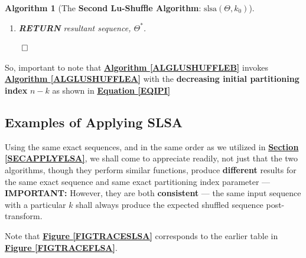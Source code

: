 \documentclass[a4paper, 18pt]{book} %
\newtheorem{alg}{Algorithm}
\begin{document}
\begin{alg}[The \textbf{Second Lu-Shuffle Algorithm}: $\text{slsa}(\Theta, k_0)$]
\begin{enumerate}
{\begin{enumerate}
	\item{\textbf{IF} $k$ is \textbf{ODD}: $(k \mod 2) = 1$:
		\begin{enumerate}
			\item \textbf{UPDATE} \textbf{resultant sequence}, $\Theta^* = \Theta_{rest} \cdot \Theta_{swap}$
		\end{enumerate}
	}
	\item{\textbf{ELSE IF} $k$ is \textbf{EVEN}: $(k \mod 2) = 0$:
		\begin{enumerate}
		\item \textbf{UPDATE} \textbf{resultant sequence}, $\Theta^* = \Theta_{swap} \cdot \Theta_{rest}$
		\end{enumerate}
	}
	
	\item \textbf{INCREMENT} $k$: $k = k + 1$
\end{enumerate}
}
\item \textbf{RETURN} resultant sequence, $\Theta^*$.
\end{enumerate}
$\qed$
\end{alg}

So, important to note that \textbf{\hyperref[ALGLUSHUFFLEB]{Algorithm \ref{ALGLUSHUFFLEB}}} invokes \textbf{\hyperref[ALGLUSHUFFLEA]{Algorithm \ref{ALGLUSHUFFLEA}}} with the \textbf{decreasing initial partitioning index} $n-k$ as shown in \textbf{\hyperref[EQIPI]{Equation \ref{EQIPI}}}



\subsection{Examples of Applying SLSA}
\label{SECAPPLYSLSA}



Using the same exact sequences, and in the same order as we utilized in \textbf{\hyperref[SECAPPLYFLSA]{Section \ref{SECAPPLYFLSA}}}, we shall come to appreciate readily, not just that the two algorithms, though they perform similar functions, produce \textbf{different} results for the same exact sequence and same exact partitioning index parameter --- \textbf{IMPORTANT:} However, they are both \textbf{consistent} --- the same input sequence with a particular $k$ shall always produce the expected shuffled sequence post-transform.

Note that \textbf{\hyperref[FIGTRACESLSA]{Figure \ref{FIGTRACESLSA}}} corresponds to the earlier table in \textbf{\hyperref[FIGTRACEFLSA]{Figure \ref{FIGTRACEFLSA}}}.
\end{document}
